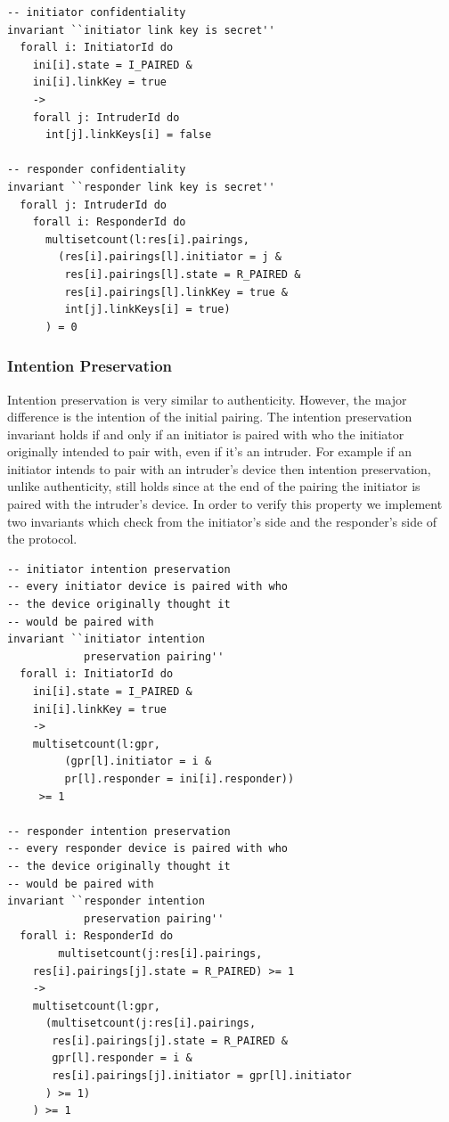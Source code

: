 \documentclass{acm_proc_article-sp}
\begin{document}
\begin{verbatim}
-- initiator confidentiality
invariant ``initiator link key is secret''
  forall i: InitiatorId do
    ini[i].state = I_PAIRED &
    ini[i].linkKey = true
    ->
    forall j: IntruderId do
      int[j].linkKeys[i] = false

-- responder confidentiality
invariant ``responder link key is secret''
  forall j: IntruderId do
    forall i: ResponderId do
      multisetcount(l:res[i].pairings, 
        (res[i].pairings[l].initiator = j & 
         res[i].pairings[l].state = R_PAIRED & 
         res[i].pairings[l].linkKey = true & 
         int[j].linkKeys[i] = true)
      ) = 0
\end{verbatim}

\subsubsection{Intention Preservation}
Intention preservation is very similar to authenticity. However, the major difference is the intention of the initial pairing. The intention preservation invariant holds if and only if an initiator is paired with who the initiator originally intended to pair with, even if it's an intruder. For example if an initiator intends to pair with an intruder's device then intention preservation, unlike authenticity, still holds since at the end of the pairing the initiator is paired with the intruder's device. In order to verify this property we implement two invariants which check from the initiator's side and the responder's side of the protocol.

\begin{verbatim}
-- initiator intention preservation
-- every initiator device is paired with who 
-- the device originally thought it 
-- would be paired with
invariant ``initiator intention 
            preservation pairing''
  forall i: InitiatorId do
    ini[i].state = I_PAIRED &
    ini[i].linkKey = true
    ->
    multisetcount(l:gpr,
         (gpr[l].initiator = i &
         pr[l].responder = ini[i].responder))
     >= 1

-- responder intention preservation
-- every responder device is paired with who 
-- the device originally thought it 
-- would be paired with
invariant ``responder intention 
            preservation pairing''
  forall i: ResponderId do
        multisetcount(j:res[i].pairings,
    res[i].pairings[j].state = R_PAIRED) >= 1
    ->
    multisetcount(l:gpr,
      (multisetcount(j:res[i].pairings,
       res[i].pairings[j].state = R_PAIRED &
       gpr[l].responder = i &
       res[i].pairings[j].initiator = gpr[l].initiator
      ) >= 1)
    ) >= 1
\end{verbatim}
\end{document}

